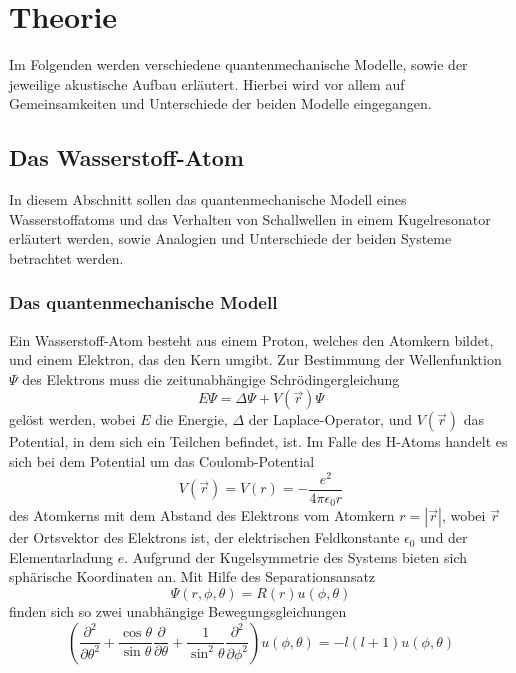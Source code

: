 \section{Theorie}
Im Folgenden werden verschiedene quantenmechanische Modelle, sowie der jeweilige akustische Aufbau erläutert. Hierbei wird vor allem auf Gemeinsamkeiten und Unterschiede der beiden Modelle eingegangen.

\subsection{Das Wasserstoff-Atom}
In diesem Abschnitt sollen das quantenmechanische Modell eines Wasserstoffatoms und das Verhalten von Schallwellen in einem Kugelresonator erläutert werden, sowie Analogien und Unterschiede der beiden Systeme betrachtet werden.
\subsubsection{Das quantenmechanische Modell}
Ein Wasserstoff-Atom besteht aus einem Proton, welches den Atomkern bildet, und einem Elektron, das den Kern umgibt. Zur Bestimmung der Wellenfunktion $\Psi$ des Elektrons muss die zeitunabhängige Schrödingergleichung
\begin{equation*}
  E \Psi = \Delta \Psi + V \left( \vec{r} \right) \Psi
\end{equation*}
gelöst werden, wobei $E$ die Energie, $\Delta$ der Laplace-Operator, und $V \left( \vec{r} \right)$ das Potential, in dem sich ein Teilchen befindet, ist. Im Falle des H-Atoms handelt es sich bei dem Potential um das Coulomb-Potential
\begin{equation*}
  V \left( \vec{r} \right) = V \left( r \right) = - \frac{e^2}{4\pi \epsilon_0 r}
\end{equation*}
des Atomkerns mit dem Abstand des Elektrons vom Atomkern $r = |\vec{r}|$, wobei $\vec{r}$ der Ortsvektor des Elektrons ist, der elektrischen Feldkonstante $\epsilon_0$ und der Elementarladung $e$.
Aufgrund der Kugelsymmetrie des Systems bieten sich sphärische Koordinaten an. Mit Hilfe des Separationsansatz
\begin{equation*}
  \Psi \left( r, \phi, \theta \right) = R\left( r \right) u \left( \phi, \theta \right)
\end{equation*}
finden sich so zwei unabhängige Bewegungsgleichungen
\begin{equation*}
  \left( \frac{\partial^2}{\partial \theta^2} + \frac{\cos \theta}{\sin \theta} \frac{\partial}{\partial \theta} + \frac{1}{\sin^2 \theta} \frac{\partial^2}{\partial \phi^2} \right) u \left( \phi, \theta \right) = -l \left( l + 1 \right) u \left( \phi, \theta \right)
\end{equation*}
